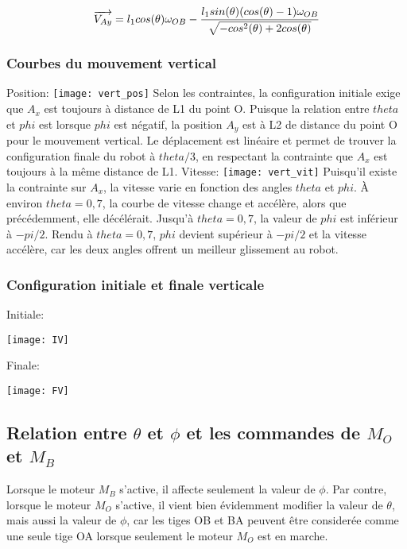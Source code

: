 \documentclass{article}
\begin{document}
\begin{equation}
\overrightarrow{V_{Ay}} = l_1cos(\theta)\omega_{OB}-\\
\frac{l_1sin(\theta)(cos(\theta)-1)\omega_{OB}}{\sqrt{-cos^2(\theta)+2cos(\theta)}}
\end{equation}

\subsubsection{Courbes du mouvement vertical}
\noindent Position:
\newline
\noindent \texttt{[image: vert\_pos]}
Selon les contraintes, la configuration initiale exige que $A_x$ est toujours à distance de L1 du point O. Puisque la relation entre $theta$ et $phi$ est lorsque $phi$ est négatif, la position $A_y$ est à L2 de distance du point O pour le mouvement vertical. Le déplacement est linéaire et permet de trouver la configuration finale du robot à $theta/3$, en respectant la contrainte que $A_x$ est toujours à la même distance de L1.
\newline
\newline
\noindent Vitesse:
\newline
\noindent \texttt{[image: vert\_vit]}
Puisqu'il existe la contrainte sur $A_x$, la vitesse varie en fonction des angles $theta$ et $phi$. À environ $theta = 0,7$, la courbe de vitesse change et accélère, alors que précédemment, elle décélérait. Jusqu'à $theta = 0,7$, la valeur de $phi$ est inférieur à $-pi/2$. Rendu à $theta = 0,7$, $phi$ devient supérieur à $-pi/2$ et la vitesse accélère, car les deux angles offrent un meilleur glissement au robot.

\subsubsection{Configuration initiale et finale verticale}
\noindent Initiale:
\newline
\centerline{\noindent \texttt{[image: IV]}}
\newline
\newline
\noindent Finale:
\newline
\centerline{\noindent \texttt{[image: FV]}}
\newline

\subsection{Relation entre $\theta$ et $\phi$ et les commandes de $M_O$ et $M_B$}
\noindent 
Lorsque le moteur $M_B$ s'active, il affecte seulement la valeur de $\phi$. Par contre, lorsque le moteur $M_O$ s'active, il vient bien évidemment modifier la valeur de $\theta$, mais aussi la valeur de $\phi$, car les tiges OB et BA peuvent être considerée comme une seule tige OA lorsque seulement le moteur $M_O$ est en marche.
\end{document}
